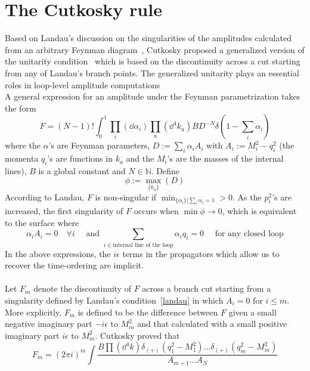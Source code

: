 \section{The Cutkosky rule}
Based on Landau's discussion on the singularities of the amplitudes calculated from an arbitrary Feynman diagram~\cite{LANDAU1959181}, 
Cutkosky proposed a generalized version of the unitarity condition~\cite{doi:10.1063/1.1703676} which is based on the discontinuity across a cut starting from any of Landau's branch points.
The generalized unitarity plays an essential roles in loop-level amplitude computations~\cite{Bern:1994zx, Bern:1994cg} 
%
\\
%
A general expression for an amplitude under the Feynman parametrization takes the form
\begin{equation}
F = (N-1)!\int_0^1 \prod_i(\dd \alpha_i) \prod_a(\dd^4 k_a ) BD^{-N}\delta(1-\sum_i\alpha_i)
\end{equation}
where the $\alpha$'s are Feynman parameters, $D:=\sum_i \alpha_i A_i$ with $A_i:= M_i^2 - q_i^2$ (the momenta $q_i$'s are functions in $k_a$ and the $M_i$'s are the masses of the internal lines), $B$ is a global constant and $N\in\mathbb{N}$.
Define
\begin{equation*}
\phi := \max_{\{k_a\}}(D)
\end{equation*}
According to Landau, $F$ is non-singular if $\min_{\{\alpha_i\}|\sum_i\alpha_i = 1}>0$.
As the $p_i^2$'s are increased, the first singularity of $F$ occurs when $\min\phi\rightarrow 0$, which is equivalent to the surface where
\begin{equation}\label{landau}
\alpha_i A_i = 0 \quad\forall i \quad\textrm{ and } \sum_{i\in\textrm{internal line of the loop}}\alpha_i q_i = 0 \quad\textrm{ for any closed loop}
\end{equation}
In the above expressions, the $i\epsilon$ terms in the propagators which allow us to recover the time-ordering are implicit.
%
\\\\ 
Let $F_m$ denote the discontinuity of $F$ across a branch cut starting from a singularity defined by Landau's condition~\cref{landau} in which $A_i = 0$ for $i\leq m$. 
More explicitly, $F_m$ is defined to be the difference between $F$ given a small negative imaginary part $-i\epsilon$ to $M^2_m$ and that calculated with a small positive imaginary part $i\epsilon$ to $M^2_m$.
Cutkosky proved that 
\begin{equation}\label{disc}
F_m = (2\pi i)^m\int\frac{B\prod(\dd^4k)\delta_{(+)}(q_1^2 - M_1^2)\ldots\delta_{(+)}(q_m^2 - M_m^2)}{A_{m+1}\ldots A_N}
\end{equation}
%
%
